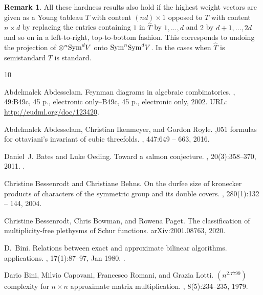 \documentclass[10pt,a4paper]{article}
\numberwithin{equation}{section}
\theoremstyle{definition}
\newtheorem{remark}[equation]{Remark}
\newcommand{\Sym}{\textup{Sym}}
\begin{document}
\begin{remark}
    All these hardness results also hold if the highest weight vectors are given as a Young tableau $T$ with content $(nd) \times 1$ opposed to $\hat{T}$ with content $n \times d$ by replacing the entries containing $1$ in $\hat{T}$ by $1, \ldots, d$ and $2$ by $d+1, \ldots, 2d$ and so on in a left-to-right, top-to-bottom fashion.
    This corresponds to undoing the projection of $\otimes^n\Sym^d V$ onto $\Sym^n\Sym^d V$.
    In the cases when $\hat{T}$ is semistandard $T$ is standard.
\end{remark}


\begin{thebibliography}{10}

Abdelmalek Abdesselam.
\newblock Feynman diagrams in algebraic combinatorics.
,
  49:B49c, 45 p., electronic only--B49c, 45 p., electronic only, 2002.
\newblock URL: \url{http://eudml.org/doc/123420}.

Abdelmalek Abdesselam, Christian Ikenmeyer, and Gordon Royle.
,051 formulas for ottaviani's invariant of cubic threefolds.
, 447:649 -- 663, 2016.

Daniel~J. Bates and Luke Oeding.
\newblock Toward a salmon conjecture.
, 20(3):358--370, 2011.
\newblock \href {https://doi.org/10.1080/10586458.2011.576539}
  {}.

Christine Bessenrodt and Christiane Behns.
\newblock On the durfee size of kronecker products of characters of the
  symmetric group and its double covers.
, 280(1):132 -- 144, 2004.

Christine Bessenrodt, Chris Bowman, and Rowena Paget.
\newblock The classification of multiplicity-free plethysms of {S}chur
  functions.
\newblock arXiv:2001.08763, 2020.

D.~Bini.
\newblock Relations between exact and approximate bilinear algorithms.
  applications.
, 17(1):87--97, Jan 1980.
\newblock \href {https://doi.org/10.1007/BF02575865}
  {}.

Dario Bini, Milvio Capovani, Francesco Romani, and Grazia Lotti.
$(n^{2.7799})$ complexity for $n \times n$ approximate matrix
  multiplication.
, 8(5):234--235, 1979.


\end{thebibliography}
\end{document}
